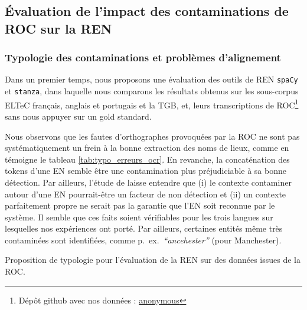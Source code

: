 \subsection{Évaluation de l'impact des contaminations de ROC sur la REN} 

\subsubsection{Typologie des contaminations et problèmes d'alignement}

\label{subsec:typologie-OCR}

Dans un premier temps, nous proposons une évaluation des outils de REN \texttt{spaCy} et \texttt{stanza}, dans laquelle nous comparons les résultats obtenus sur les sous-corpus ELTeC français, anglais et portugais et la TGB, et, leurs transcriptions de ROC\footnote{Dépôt github avec nos données : \url{anonymous}} sans nous appuyer sur un gold standard.

Nous observons que les fautes d'orthographes provoquées par la ROC ne sont pas systématiquement un frein à la bonne extraction des noms de lieux, comme en témoigne le tableau \ref{tab:typo_erreurs_ocr}. En revanche, la concaténation des tokens d'une EN semble être une contamination plus préjudiciable à sa bonne détection. Par ailleurs, l'étude de \cite{DBLP:conf/gis/Koudoro-Parfait21} laisse entendre que (i) le contexte contaminer autour d'une EN pourrait-être un facteur de non détection et (ii) un contexte parfaitement propre ne serait pas la garantie que l'EN soit reconnue par le système. Il semble que ces faits soient vérifiables pour les trois langues sur lesquelles nos expériences ont porté. Par ailleurs, certaines entités même très contaminées sont identifiées, comme p.\ ex.\  \textit{``ancehester''} (pour \og{}Manchester\fg{}). 

\begin{table}[h!]
\small
    \centering
   
    \caption{Proposition de typologie pour l'évaluation de la REN sur des données issues de la ROC.}
    \label{tab:typo_erreurs_ocr}
\end{table}


